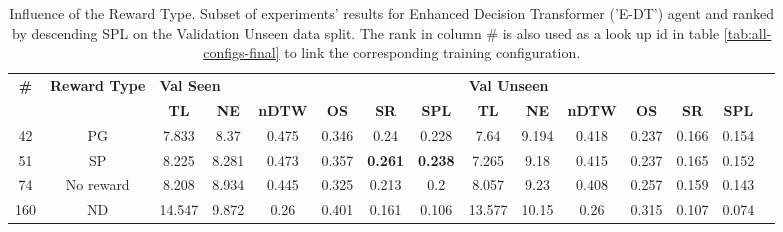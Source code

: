 \begin{table}
\centering
\caption{\label{tab:e_dt_reward_type}Influence of the Reward Type. Subset of experiments' results for Enhanced Decision Transformer ('E-DT') agent and ranked by descending SPL on the Validation Unseen data split. The rank in column \# is also used as a look up id in table \ref{tab:all-configs-final} to link the corresponding training configuration.}
\begin{tabular}{@{\hskip3pt}c@{\hskip3pt}c@{\hskip3pt}c@{\hskip3pt}c@{\hskip3pt}c@{\hskip3pt}c@{\hskip3pt}c@{\hskip3pt}c@{\hskip3pt}c@{\hskip3pt}c@{\hskip3pt}c@{\hskip3pt}c@{\hskip3pt}c@{\hskip3pt}c@{\hskip3pt}c}
\toprule
\textbf{\#} & \textbf{Reward Type} & \multicolumn{6}{l}{\textbf{Val Seen}} & \multicolumn{6}{l}{\textbf{Val Unseen}} \\
 \textbf{~} &           \textbf{~} &       \textbf{TL} & \textbf{NE} & \textbf{nDTW} & \textbf{OS} &     \textbf{SR} &    \textbf{SPL} &         \textbf{TL} & \textbf{NE} & \textbf{nDTW} & \textbf{OS} & \textbf{SR} & \textbf{SPL} \\
\midrule
         42 &                   PG &             7.833 &        8.37 &         0.475 &       0.346 &            0.24 &           0.228 &                7.64 &       9.194 &         0.418 &       0.237 &       0.166 &        0.154 \\
         51 &                   SP &             8.225 &       8.281 &         0.473 &       0.357 &  \textbf{0.261} &  \textbf{0.238} &               7.265 &        9.18 &         0.415 &       0.237 &       0.165 &        0.152 \\
         74 &            No reward &             8.208 &       8.934 &         0.445 &       0.325 &           0.213 &             0.2 &               8.057 &        9.23 &         0.408 &       0.257 &       0.159 &        0.143 \\
        160 &                   ND &            14.547 &       9.872 &          0.26 &       0.401 &           0.161 &           0.106 &              13.577 &       10.15 &          0.26 &       0.315 &       0.107 &        0.074 \\
\bottomrule
\end{tabular}
\end{table}
